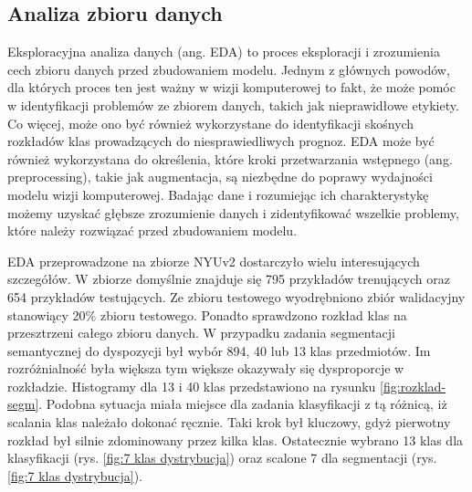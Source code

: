 \subsection{Analiza zbioru danych}
Eksploracyjna analiza danych (ang. EDA) to proces eksploracji i zrozumienia cech zbioru danych przed zbudowaniem modelu. Jednym z głównych powodów, dla których proces ten jest ważny w wizji komputerowej to fakt, że może pomóc w identyfikacji problemów ze zbiorem danych, takich jak nieprawidłowe etykiety. Co więcej, może ono być również wykorzystane do identyfikacji skośnych rozkładów klas prowadzących do niesprawiedliwych prognoz. EDA może być również wykorzystana do określenia, które kroki przetwarzania wstępnego (ang. preprocessing), takie jak augmentacja, są niezbędne do poprawy wydajności modelu wizji komputerowej. Badając dane i rozumiejąc ich charakterystykę możemy uzyskać głębsze zrozumienie danych i zidentyfikować wszelkie problemy, które należy rozwiązać przed zbudowaniem modelu.

EDA przeprowadzone na zbiorze NYUv2 dostarczyło wielu interesujących szczegółów. W zbiorze domyślnie znajduje się 795 przykładów trenujących oraz 654 przykładów testujących. Ze zbioru testowego wyodrębniono zbiór walidacyjny stanowiący 20\% zbioru testowego. Ponadto sprawdzono rozkład klas na przesztrzeni całego zbioru danych.
W przypadku zadania segmentacji semantycznej do dyspozycji był wybór 894, 40 lub 13 klas przedmiotów. Im rozróżnialność była większa tym większe okazywały się dysproporcje w rozkładzie. Histogramy dla 13 i 40 klas przedstawiono na rysunku \ref{fig:rozklad-segm}.
Podobna sytuacja miała miejsce dla zadania klasyfikacji z tą różnicą, iż scalania klas należało dokonać ręcznie. Taki krok był kluczowy, gdyż pierwotny rozkład był silnie zdominowany przez kilka klas.
Ostatecznie wybrano 13 klas dla klasyfikacji (rys. \ref{fig:7 klas dystrybucja}) oraz scalone 7 dla segmentacji (rys. \ref{fig:7 klas dystrybucja}).


